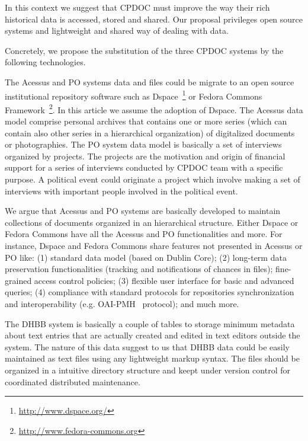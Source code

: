 \documentclass{llncs}
\begin{document}
In this context we suggest that CPDOC must improve the way their rich
historical data is accessed, stored and shared. Our proposal
privileges open source systems and lightweight and shared way of
dealing with data.


Concretely, we propose the substitution of the three CPDOC systems
by the following technologies.

The Acessus and PO systems data and files could be migrate to an
open source institutional repository software such as
Dspace~\footnote{\url{http://www.dspace.org/}} or Fedora Commons
Framework~\footnote{\url{http://www.fedora-commons.org}}. In this
article we assume the adoption of Dspace. The Acessus data model
comprise personal archives that contains one or more series (which can
contain also other series in a hierarchical organization) of
digitalized documents or photographies. The PO system data model is
basically a set of interviews organized by projects. The projects are
the motivation and origin of financial support for a series of
interviews conducted by CPDOC team with a specific purpose. A political event 
could originate a project which involve
making a set of interviews with important people involved in the
political event.

We argue that Acessus and PO systems are basically developed to
maintain collections of documents organized in an hierarchical
structure. Either Dspace or Fedora Commons have all the Acessus and PO
functionalities and more. For instance, Dspace and Fedora Commons
share features not presented in Acessus or PO like: (1) standard data
model (based on Dublin Core); (2) long-term data preservation
functionalities (tracking and notifications of chances in files);
fine-grained access control policies; (3) flexible user interface for
basic and advanced queries; (4) compliance with standard protocols for
repositories synchronization and interoperability
(e.g. OAI-PMH~\cite{oai} protocol); and much more.

The DHBB system is basically a couple of tables to storage minimum
metadata about text entries that are actually created and edited in
text editors outside the system. The nature of this data suggest to us
that DHBB data could be easily maintained as text files using any
lightweight markup syntax. The files should be organized in a
intuitive directory structure and keept under version control for
coordinated distributed maintenance.
\end{document}
